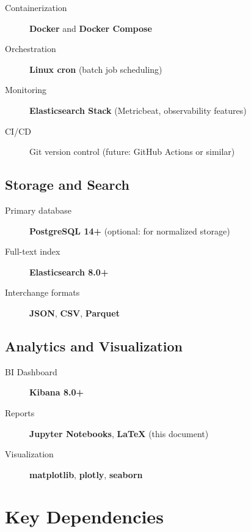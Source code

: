 \documentclass[12pt,a4paper]{report}
\begin{document}
\begin{description}
    \item[Containerization] \textbf{Docker} and \textbf{Docker Compose}
    \item[Orchestration] \textbf{Linux cron} (batch job scheduling)
    \item[Monitoring] \textbf{Elasticsearch Stack} (Metricbeat, observability features)
    \item[CI/CD] Git version control (future: GitHub Actions or similar)
\end{description}

\subsection{Storage and Search}

\begin{description}
    \item[Primary database] \textbf{PostgreSQL 14+} (optional: for normalized storage)
    \item[Full-text index] \textbf{Elasticsearch 8.0+}
    \item[Interchange formats] \textbf{JSON}, \textbf{CSV}, \textbf{Parquet}
\end{description}

\subsection{Analytics and Visualization}

\begin{description}
    \item[BI Dashboard] \textbf{Kibana 8.0+}
    \item[Reports] \textbf{Jupyter Notebooks}, \textbf{LaTeX} (this document)
    \item[Visualization] \textbf{matplotlib}, \textbf{plotly}, \textbf{seaborn}
\end{description}

\section{Key Dependencies}
\end{document}
